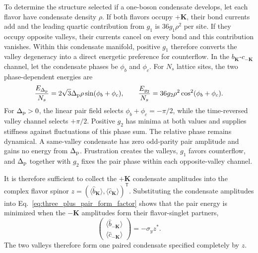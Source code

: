 \documentclass[onecolumn,aps,prb,amsmath,amssymb,superscriptaddress,longbibliography]{revtex4-2}
\newcommand{\trans}{\mathsf{T}}
\begin{document}
To determine the structure selected if a one-boson condensate develops, let each flavor have condensate density \(\rho\).  If both flavors occupy \(+\mathbf K\), their bond currents add and the leading quartic contribution from \(g_1\) is \(36g_1\rho^2\) per site.  If they occupy opposite valleys, their currents cancel on every bond and this contribution vanishes.  Within this condensate manifold, positive \(g_1\) therefore converts the valley degeneracy into a direct energetic preference for counterflow.  In the \(b_{\mathbf K}\)-\(c_{-\mathbf K}\) channel, let the condensate phases be \(\phi_b\) and \(\phi_c\).  For \(N_s\) lattice sites, the two phase-dependent energies are
\begin{equation}
    \frac{E_{\Delta_{\rm p}}}{N_s}=2\sqrt{3}\Delta_{\rm p}\rho\sin(\phi_b+\phi_c),
    \qquad \frac{E_{g_2}}{N_s}=36g_2\rho^2\cos^2(\phi_b+\phi_c).
    \label{eq:three_plus_mean_field_pair_energy}
\end{equation}
For \(\Delta_{\rm p}>0\), the linear pair field selects \(\phi_b+\phi_c=-\pi/2\), while the time-reversed valley channel selects \(+\pi/2\).  Positive \(g_2\) has minima at both values and supplies stiffness against fluctuations of this phase sum.  The relative phase remains dynamical.  A same-valley condensate has zero odd-parity pair amplitude and gains no energy from \(\Delta_{\rm p}\).  Frustration creates the valleys, \(g_1\) favors counterflow, and \(\Delta_{\rm p}\) together with \(g_2\) fixes the pair phase within each opposite-valley channel.

It is therefore sufficient to collect the \(+\mathbf K\) condensate amplitudes into the complex flavor spinor \(z=(\langle\hat b_{\mathbf K}\rangle,\langle\hat c_{\mathbf K}\rangle)^\trans\).  Substituting the condensate amplitudes into Eq.~\eqref{eq:three_plus_pair_form_factor} shows that the pair energy is minimized when the \(-\mathbf K\) amplitudes form their flavor-singlet partners,
\begin{equation}
    \begin{pmatrix}
        \langle\hat b_{-\mathbf K}\rangle\\
        \langle\hat c_{-\mathbf K}\rangle
    \end{pmatrix}
    =-\sigma_yz^*.
    \label{eq:three_plus_spinor_locking}
\end{equation}
The two valleys therefore form one paired condensate specified completely by \(z\).
\end{document}
